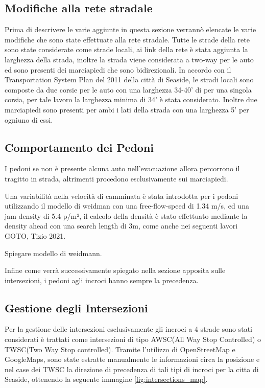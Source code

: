 \subsection*{Modifiche alla rete stradale}
Prima di descrivere le varie aggiunte in questa sezione verrannò elencate le varie modifiche che sono state effettuate alla rete stradale.
Tutte le strade della rete sono state considerate come strade locali, ai link della rete è stata aggiunta la larghezza della strada,
inoltre la strada viene considerata a two-way per le auto ed sono presenti dei marciapiedi che sono bidirezionali.
In accordo con il Transportation System Plan del 2011 della città di Seaside, le stradi locali sono composte da due corsie per le auto
con una larghezza 34-40' di per una singola corsia, per tale lavoro la larghezza minima di 34' è stata considerato.
Inoltre due marciapiedi sono presenti per ambi i lati della strada con una larghezza 5' per ogniuno di essi.

\subsection{Comportamento dei Pedoni}
I pedoni se non è presente alcuna auto nell'evacuazione allora percorrono il tragitto in strada, altrimenti procedono esclusivamente sui marciapiedi.

Una variabilità nella velocità di camminata è stata introdotta per i pedoni utilizzando il modello di weidman con una free-flow-speed di 1.34 m/s,
ed una jam-density di 5.4 p/m², il calcolo della densità è stato effettuato mediante la density ahead con una search length di 3m, come anche nei seguenti lavori GOTO, Tizio 2021.

Spiegare modello di weidmann.

Infine come verrà successivamente spiegato nella sezione apposita sulle intersezioni, i pedoni agli incroci hanno sempre la precedenza.

\subsection{Gestione degli Intersezioni}
Per la gestione delle intersezioni esclusivamente gli incroci a 4 strade sono stati considerati è trattati come intersezioni di tipo AWSC(All Way Stop Controlled) o TWSC(Two Way Stop controlled).
Tramite l'utilizzo di OpenStreetMap e GoogleMaps, sono state estratte manualmente le informazioni circa la posizione e nel case dei TWSC la direzione
di precedenza di tali tipi di incroci per la citta di Seaside, ottenendo la seguente immagine \ref{fig:intersections_map}.

